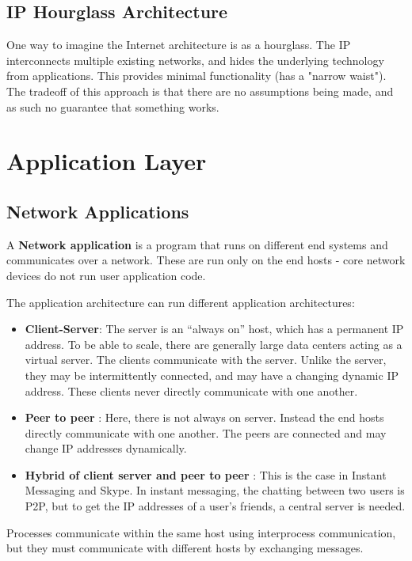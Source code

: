 \documentclass[12pt,letterpaper]{article}
\theoremstyle{definition}
\begin{document}
\subsection{IP Hourglass Architecture}

One way to imagine the Internet architecture is as a hourglass. The IP interconnects multiple existing networks, and hides the underlying technology from applications. This provides minimal functionality (has a "narrow waist"). The tradeoff of this approach is that there are no assumptions being made, and as such no guarantee that something works.

\section{Application Layer}

\subsection{Network Applications}

A \textbf{Network application} is a program that runs on different end systems and communicates over a network. These are run only on the end hosts - core network devices do not run user application code.

The application architecture can run different application architectures:

\begin{itemize}
  \item \textbf{Client-Server}: The server is an ``always on'' host, which has a permanent IP address. To be able to scale, there are generally large data centers acting as a virtual server. The clients communicate with the server. Unlike the server, they may be intermittently connected, and may have a changing dynamic IP address. These clients never directly communicate with one another.
  \item \textbf{Peer to peer} : Here, there is not always on server. Instead the end hosts directly communicate with one another. The peers are connected and may change IP addresses dynamically.
  \item \textbf{Hybrid of client server and peer to peer} : This is the case in Instant Messaging and Skype. In instant messaging, the chatting between two users is P2P, but to get the IP addresses of a user's friends, a central server is needed.
\end{itemize}

Processes communicate within the same host using interprocess communication, but they must communicate with different hosts by exchanging messages.
\end{document}
